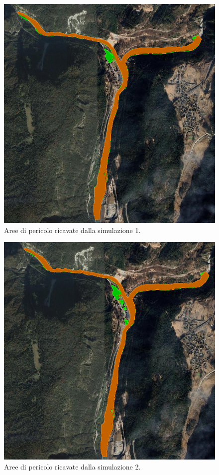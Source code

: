 \begin{figure}[H] \centering
    \includegraphics[scale=0.5]{immagini/aree_pericolo_1.png}
    \caption{Aree di pericolo ricavate dalla simulazione 1.}
    \label{figure:aree_pericolo_1}
\end{figure}

\begin{figure}[H] \centering
    \includegraphics[scale=0.5]{immagini/aree_pericolo_2.png}
    \caption{Aree di pericolo ricavate dalla simulazione 2.}
    \label{figure:aree_pericolo_2}
\end{figure}

